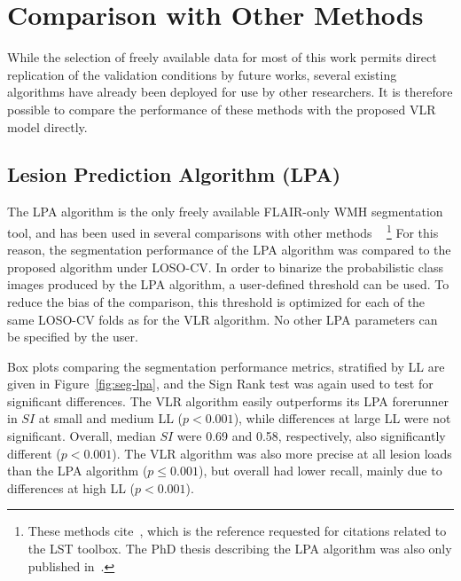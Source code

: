 \section{Comparison with Other Methods}
While the selection of freely available data for most of this work
permits direct replication of the validation conditions by future works,
several existing algorithms have already been deployed for use by other researchers.
It is therefore possible to compare the performance of these methods with
the proposed VLR model directly.
\subsection{Lesion Prediction Algorithm (LPA)}\label{ss:exp-lpa}
The LPA algorithm is the only freely available FLAIR-only WMH segmentation tool,
and has been used in several comparisons with other methods%
~\cite{Egger2017,Griffanti2016,Brosch2016}%
\footnote{These methods cite~\cite{Schmidt2012},
  which is the reference requested for citations related to the LST toolbox.
  The PhD thesis describing the LPA algorithm was also only published in~\citeyear{Schmidt2017}.}
For this reason, the segmentation performance of the LPA algorithm
was compared to the proposed algorithm under LOSO-CV.
In order to binarize the probabilistic class images produced by the LPA algorithm,
a user-defined threshold can be used.
To reduce the bias of the comparison,
this threshold is optimized for each of the same LOSO-CV folds as for the VLR algorithm.
No other LPA parameters can be specified by the user.
\par
Box plots comparing the segmentation performance metrics, stratified by LL
are given in Figure~\ref{fig:seg-lpa}, and
the Sign Rank test was again used to test for significant differences.
The VLR algorithm easily outperforms its LPA forerunner
in $SI$ at small and medium LL ($p < 0.001$),
while differences at large LL were not significant.
Overall, median $SI$ were 0.69 and 0.58, respectively, also significantly different ($p < 0.001$).
The VLR algorithm was also more precise at all lesion loads than the LPA algorithm ($p \le 0.001$),
but overall had lower recall, mainly due to differences at high LL ($p < 0.001$).
\par
